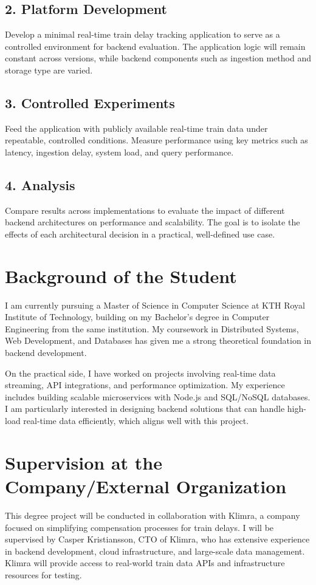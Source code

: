 \documentclass[a4paper,12pt]{article}
\begin{document}
\subsection*{2. Platform Development}
Develop a minimal real-time train delay tracking application to serve as a controlled environment for backend evaluation. The application logic will remain constant across versions, while backend components such as ingestion method and storage type are varied.

\subsection*{3. Controlled Experiments}
Feed the application with publicly available real-time train data under repeatable, controlled conditions. Measure performance using key metrics such as latency, ingestion delay, system load, and query performance.

\subsection*{4. Analysis}
Compare results across implementations to evaluate the impact of different backend architectures on performance and scalability. The goal is to isolate the effects of each architectural decision in a practical, well-defined use case.

\newpage
\section{Background of the Student}
I am currently pursuing a Master of Science in Computer Science at KTH Royal Institute of Technology, building on my Bachelor's degree in Computer Engineering from the same institution. My coursework in Distributed Systems, Web Development, and Databases has given me a strong theoretical foundation in backend development.

On the practical side, I have worked on projects involving real-time data streaming, API integrations, and performance optimization. My experience includes building scalable microservices with Node.js and SQL/NoSQL databases. I am particularly interested in designing backend solutions that can handle high-load real-time data efficiently, which aligns well with this project.

\section{Supervision at the Company/External Organization}
This degree project will be conducted in collaboration with Klimra, a company focused on simplifying compensation processes for train delays. I will be supervised by Casper Kristiansson, CTO of Klimra, who has extensive experience in backend development, cloud infrastructure, and large-scale data management. Klimra will provide access to real-world train data APIs and infrastructure resources for testing.
\end{document}
